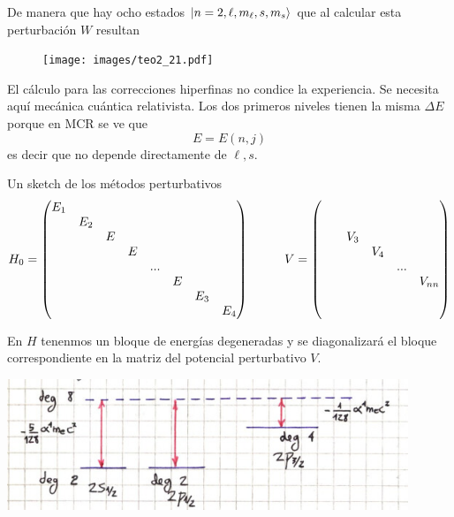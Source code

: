 \documentclass[10pt,oneside]{CBFT_book}
\begin{document}
De manera que hay ocho estados $\Ket{n=2,\ell,m_\ell,s,m_s}$ que al calcular esta perturbación $W$
resultan 
\begin{figure}[htb]
	\begin{center}
	\texttt{[image: images/teo2\_21.pdf]}
	\end{center}
	\caption{}
\end{figure} 

El cálculo para las correcciones hiperfinas no condice la experiencia. Se necesita aquí mecánica cuántica 
relativista. Los dos primeros niveles tienen la misma $\Delta E$ porque en MCR se ve que 
\[
	E = E(n,j) 
\]
es decir que no depende directamente de $\ell,s$.

Un sketch de los métodos perturbativos
\[
	H_0 = \begin{pmatrix}
	       E_1 & \\
	       & E_2 & \\
	       & & E \\
	       & & & E\\
	       & & & & ...\\
	       & & & & & E\\
	       & & & & & & E_3\\
	       & & & & & & & E_4
	      \end{pmatrix}
	      \hspace*{10mm}
	      V =
		\begin{pmatrix}
		& \\
		& \\
		& & V_3 \\
		& & & V_4 \\
		& & & & ... \\
		& & & & & V_{nn} \\
		& \\
		& 
		\end{pmatrix}
\]

En $H$ tenenmos un bloque de energías degeneradas y se diagonalizará el bloque 
correspondiente en la matriz del potencial perturbativo $V$.

\includegraphics[width=0.9\textwidth]{images/fig_ft2_atomo_hidrogeno.jpg}




\end{document}
